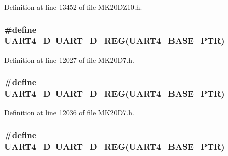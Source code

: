 Definition at line 13452 of file M\+K20\+D\+Z10.\+h.

\subsubsection[{\texorpdfstring{U\+A\+R\+T4\+\_\+D}{UART4_D}}]{\setlength{\rightskip}{0pt plus 5cm}\#define U\+A\+R\+T4\+\_\+D~{\bf U\+A\+R\+T\+\_\+\+D\+\_\+\+R\+EG}({\bf U\+A\+R\+T4\+\_\+\+B\+A\+S\+E\+\_\+\+P\+TR})}\hypertarget{group___u_a_r_t___register___accessor___macros_ga761bb0535071b04935a9584f9a999969}{}\label{group___u_a_r_t___register___accessor___macros_ga761bb0535071b04935a9584f9a999969}


Definition at line 12027 of file M\+K20\+D7.\+h.

\subsubsection[{\texorpdfstring{U\+A\+R\+T4\+\_\+D}{UART4_D}}]{\setlength{\rightskip}{0pt plus 5cm}\#define U\+A\+R\+T4\+\_\+D~{\bf U\+A\+R\+T\+\_\+\+D\+\_\+\+R\+EG}({\bf U\+A\+R\+T4\+\_\+\+B\+A\+S\+E\+\_\+\+P\+TR})}\hypertarget{group___u_a_r_t___register___accessor___macros_ga761bb0535071b04935a9584f9a999969}{}\label{group___u_a_r_t___register___accessor___macros_ga761bb0535071b04935a9584f9a999969}


Definition at line 12036 of file M\+K20\+D7.\+h.

\subsubsection[{\texorpdfstring{U\+A\+R\+T4\+\_\+D}{UART4_D}}]{\setlength{\rightskip}{0pt plus 5cm}\#define U\+A\+R\+T4\+\_\+D~{\bf U\+A\+R\+T\+\_\+\+D\+\_\+\+R\+EG}({\bf U\+A\+R\+T4\+\_\+\+B\+A\+S\+E\+\_\+\+P\+TR})}\hypertarget{group___u_a_r_t___register___accessor___macros_ga761bb0535071b04935a9584f9a999969}{}\label{group___u_a_r_t___register___accessor___macros_ga761bb0535071b04935a9584f9a999969}



